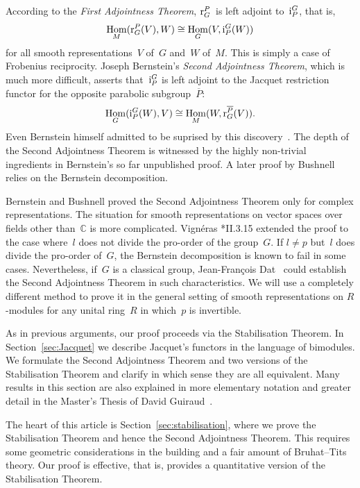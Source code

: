 \documentclass{amsart}
\theoremstyle{remark}
\theoremstyle{definition}
\DeclareMathOperator{\Hom}{Hom}%
\newcommand*{\Jaci}{\textup i}%
\newcommand*{\Jacr}{\textup r}%
\newcommand*{\nb}{\nobreakdash}%
\newcommand*{\opp}[1]{\overline{#1}}%
\newcommand*{\C}{\mathbb C}%
\newcommand{\ring}{R}%
\begin{document}
According to the \emph{First Adjointness Theorem}, \(\Jacr^P_G\)~is left adjoint to~\(\Jaci_P^G\), that is,
\[
\Hom_M (\Jacr^P_G(V),W) \cong \Hom_G(V,\Jaci_P^G (W))
\]
for all smooth representations~\(V\) of~\(G\) and~\(W\) of~\(M\).  This is simply a case of Frobenius reciprocity.  Joseph Bernstein's \emph{Second Adjointness Theorem}, which is much more difficult, asserts that~\(\Jaci_P^G\) is left adjoint to the Jacquet restriction functor for the opposite parabolic subgroup~\(\opp{P}\):
\[
\Hom_G(\Jaci^G_P(W),V) \cong \Hom_M (W, \Jacr_G^{\opp{P}} (V)).
\]
Even Bernstein himself admitted to be suprised by this discovery~\cite{Bernstein:Second_adjointness}.  The depth of the Second Adjointness Theorem is witnessed by the highly non-trivial ingredients in Bernstein's so far unpublished proof.  A later proof by Bushnell~\cite{Bushnell:Localization_Hecke} relies on the Bernstein decomposition.

Bernstein and Bushnell proved the Second Adjointness Theorem only for complex representations.  The situation for smooth representations on vector spaces over fields other than~\(\C\) is more complicated.  Vign\'eras \cite{Vigneras:l-modulaires}*{II.3.15} extended the proof to the case where~\(l\) does not divide the pro-order of the group~\(G\).  If \(l\neq p\) but~\(l\) does divide the pro-order of~\(G\), the Bernstein decomposition is known to fail in some cases.  Nevertheless, if~\(G\) is a classical group, Jean-Fran\c{c}ois Dat~\cite{Dat:Finitude} could establish the Second Adjointness Theorem in such characteristics.  We will use a completely different method to prove it in the general setting of smooth representations on \(\ring\)\nb-modules for any unital ring~\(\ring\) in which~\(p\) is invertible.

As in previous arguments, our proof proceeds via the Stabilisation Theorem.  In Section~\ref{sec:Jacquet} we describe Jacquet's functors in the language of bimodules.  We formulate the Second Adjointness Theorem and two versions of the Stabilisation Theorem and clarify in which sense they are all equivalent.  Many results in this section are also explained in more elementary notation and greater detail in the Master's Thesis of David Guiraud~\cite{Guiraud:Master}.

The heart of this article is Section~\ref{sec:stabilisation}, where we prove the Stabilisation Theorem and hence the Second Adjointness Theorem.  This requires some geometric considerations in the building and a fair amount of Bruhat--Tits theory.  Our proof is effective, that is, provides a quantitative version of the Stabilisation Theorem.
\end{document}
